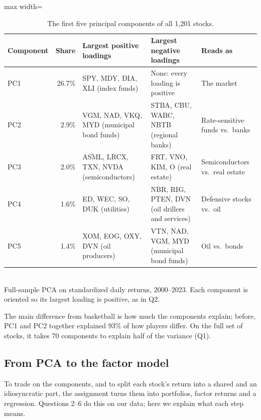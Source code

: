 \documentclass[11pt,letterpaper]{article}
\begin{document}
\begin{table}[!htbp]
    \centering
    \caption{The first five principal components of all 1,201 stocks.}
    \label{tab:primer-full}
    \small
    \setlength{\tabcolsep}{4pt}
    \begin{adjustbox}{max width=\linewidth}
        \begin{tabular}{lr >{\raggedright\arraybackslash}p{3.6cm} >{\raggedright\arraybackslash}p{3.6cm} >{\raggedright\arraybackslash}p{3.2cm}}
            \toprule
            Component & Share & Largest positive loadings & Largest negative loadings & Reads as \\
            \midrule
            PC1 & 26.7\% & SPY, MDY, DIA, XLI (index funds) & None: every loading is positive & The market \\
            \addlinespace
            PC2 & 2.9\% & VGM, NAD, VKQ, MYD (municipal bond funds) & STBA, CBU, WABC, NBTB (regional banks) & Rate-sensitive funds vs.\ banks \\
            \addlinespace
            PC3 & 2.0\% & ASML, LRCX, TXN, NVDA (semiconductors) & FRT, VNO, KIM, O (real estate) & Semiconductors vs.\ real estate \\
            \addlinespace
            PC4 & 1.6\% & ED, WEC, SO, DUK (utilities) & NBR, RIG, PTEN, DVN (oil drillers and services) & Defensive stocks vs.\ oil \\
            \addlinespace
            PC5 & 1.4\% & XOM, EOG, OXY, DVN (oil producers) & VTN, NAD, VGM, MYD (municipal bond funds) & Oil vs.\ bonds \\
            \bottomrule
        \end{tabular}
    \end{adjustbox}
    \\[4pt]
    \small Full-sample PCA on standardized daily returns, 2000--2023. Each
    component is oriented so its largest loading is positive, as in Q2.
\end{table}
The main difference from basketball is how much the components explain; before, PC1 and PC2
together explained $93\%$ of how players differ. On the full set of stocks, it takes 70
components to explain half of the variance (Q1).

\subsection{From PCA to the factor model}
To trade on the components, and to split each stock's return into a
shared and an idiosyncratic part, the assignment turns them into
portfolios, factor returns and a regression. Questions 2--6 do this on
our data; here we explain what each step means.
\end{document}
